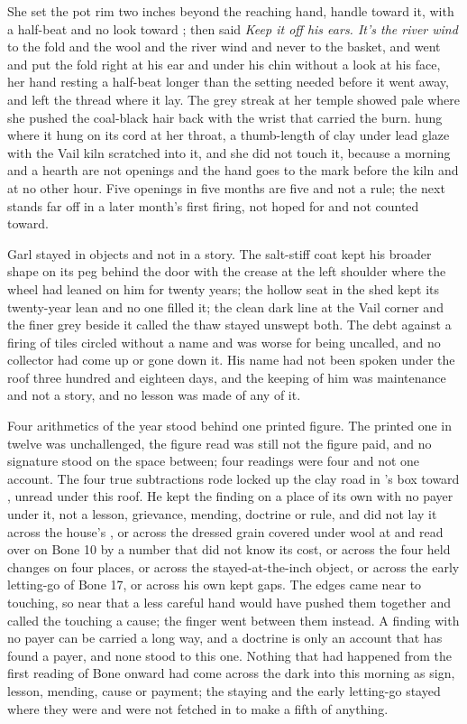 She set the pot rim two inches beyond the reaching hand, handle toward it, with a half-beat and no look toward ; then said \emph{Keep it off his ears. It's the river wind} to the fold and the wool and the river wind and never to the basket, and went and put the fold right at his ear and under his chin without a look at his face, her hand resting a half-beat longer than the setting needed before it went away, and left the thread where it lay. The grey streak at her temple showed pale where she pushed the coal-black hair back with the wrist that carried the burn.  hung where it hung on its cord at her throat, a thumb-length of clay under lead glaze with the Vail kiln scratched into it, and she did not touch it, because a morning and a hearth are not openings and the hand goes to the mark before the kiln and at no other hour. Five openings in five months are five and not a rule; the next stands far off in a later month's first firing, not hoped for and not counted toward.

Garl stayed in objects and not in a story. The salt-stiff coat kept his broader shape on its peg behind the door with the crease at the left shoulder where the wheel had leaned on him for twenty years; the hollow seat in the shed kept its twenty-year lean and no one filled it; the clean dark line at the Vail corner and the finer grey beside it called the thaw stayed unswept both. The debt against a firing of tiles circled without a name and was worse for being uncalled, and no collector had come up  or gone down it. His name had not been spoken under the roof three hundred and eighteen days, and the keeping of him was maintenance and not a story, and no lesson was made of any of it.

\scenebreak

Four arithmetics of the year stood behind one printed figure. The printed one in twelve was unchallenged, the figure read was still not the figure paid, and no signature stood on the space between; four readings were four and not one account. The four true subtractions rode locked up the clay road in 's box toward , unread under this roof. He kept the finding on a place of its own with no payer under it, not a lesson, grievance, mending, doctrine or rule, and did not lay it across the house's , or across the dressed grain covered under wool at  and read over on Bone 10 by a number that did not know its cost, or across the four held changes on four places, or across the stayed-at-the-inch object, or across the early letting-go of Bone 17, or across his own kept gaps. The edges came near to touching, so near that a less careful hand would have pushed them together and called the touching a cause; the finger went between them instead. A finding with no payer can be carried a long way, and a doctrine is only an account that has found a payer, and none stood to this one. Nothing that had happened from the first reading of Bone onward had come across the dark into this morning as sign, lesson, mending, cause or payment; the staying and the early letting-go stayed where they were and were not fetched in to make a fifth of anything.

